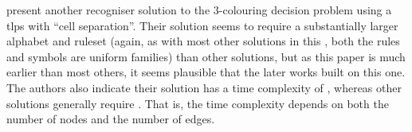 
\citeauthor{Wang2009} \cite{Wang2009} present another recogniser solution to the 3-colouring decision problem using a \gls{tlps} with \enquote{cell separation}.  Their solution seems to require a substantially larger alphabet and \gls{ruleset} (again, as with most other solutions in this , both the rules and symbols are uniform families) than other solutions, but as this paper is much earlier than most others, it seems plausible that the later works built on this one.  The authors also indicate their solution has a time complexity of , whereas other solutions generally require .  That is, the time complexity depends on both the number of nodes and the number of edges.


